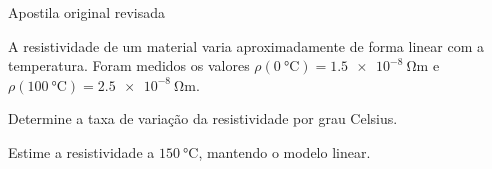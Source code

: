 \begin{questao}[3]{Apostila original revisada}

A resistividade de um material varia aproximadamente de forma linear com a
temperatura. Foram medidos os valores
$\rho(\SI{0}{\celsius})=\SI{1.5e-8}{\ohm\metre}$ e
$\rho(\SI{100}{\celsius})=\SI{2.5e-8}{\ohm\metre}$.
\begin{itensq}
\item Determine a taxa de variação da resistividade por grau Celsius.
\item Estime a resistividade a $\SI{150}{\celsius}$, mantendo o modelo linear.
\end{itensq}


\end{questao}

